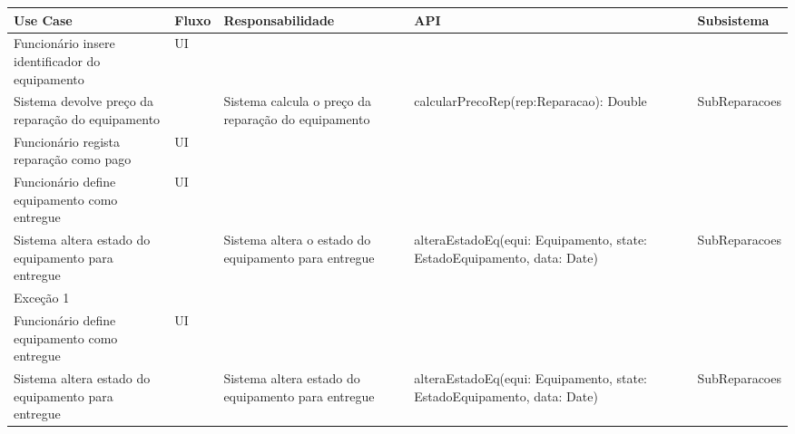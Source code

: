 \documentclass[../relatorio.tex]{subfiles}
\begin{document}
\begin{landscape}
    \begin{table}[!h]
        \centering
        \begin{tabular}{|p{5cm}|p{1cm}|p{4cm}|p{6cm}|p{3cm}|}
            \hline
            \rowcolor{gray!20!white}
            Use Case & Fluxo & Responsabilidade & API & Subsistema \\
            \hline
            \rowcolor{yellow}
            Funcionário insere identificador do equipamento
                     & UI
                     &
                     &
                     &
            \\
            \hline
            Sistema devolve preço da reparação do equipamento
                     &
                     & Sistema calcula o preço da reparação do equipamento
                     & calcularPrecoRep(rep:Reparacao): Double
                     & SubReparacoes
            \\
            \hline
            \rowcolor{yellow}
            Funcionário regista reparação como pago
                     & UI
                     &
                     &
                     &
            \\
            \hline
            \rowcolor{yellow}
            Funcionário define equipamento como entregue
                     & UI
                     &
                     &
                     &
            \\
            \hline
            Sistema altera estado do equipamento para entregue
                     &
                     & Sistema altera o estado do equipamento para entregue
                     & alteraEstadoEq(equi: Equipamento, state: EstadoEquipamento, data: Date)
                     & SubReparacoes
            \\
            \hline
            \rowcolor{red!30}
            Exceção 1 &   &   &    & \\
            \hline
            \rowcolor{yellow}
            Funcionário define equipamento como entregue
                    & UI
                    &
                    &
                    &
            \\
            \hline
            Sistema altera estado do equipamento para entregue
                    & 
                    & Sistema altera estado do equipamento para entregue
                    & alteraEstadoEq(equi: Equipamento, state: EstadoEquipamento, data: Date)
                    & SubReparacoes
            \\

\end{tabular}
\end{table}
\end{landscape}
\end{document}
